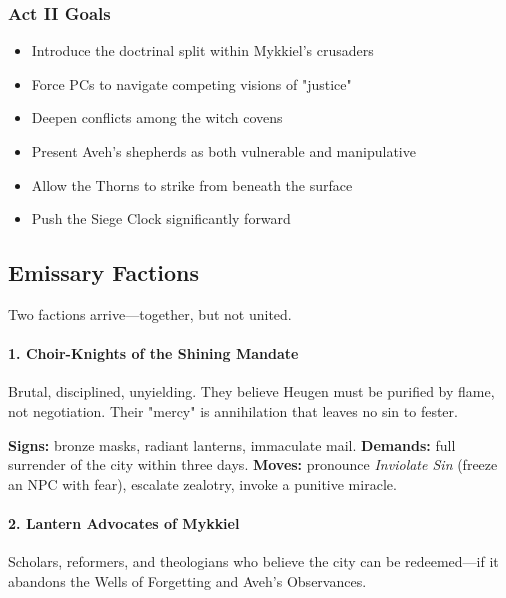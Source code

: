 \documentclass[11pt]{book}
\begin{document}
\subsubsection*{Act II Goals}
\begin{itemize}[leftmargin=*]
    \item Introduce the doctrinal split within Mykkiel's crusaders
    \item Force PCs to navigate competing visions of "justice"
    \item Deepen conflicts among the witch covens
    \item Present Aveh's shepherds as both vulnerable and manipulative
    \item Allow the Thorns to strike from beneath the surface
    \item Push the Siege Clock significantly forward
\end{itemize}

\subsection*{Emissary Factions}

Two factions arrive---together, but not united.

\paragraph{1. Choir-Knights of the Shining Mandate}
Brutal, disciplined, unyielding.  
They believe Heugen must be purified by flame, not negotiation.  
Their "mercy" is annihilation that leaves no sin to fester.

\textbf{Signs:} bronze masks, radiant lanterns, immaculate mail.  
\textbf{Demands:} full surrender of the city within three days.  
\textbf{Moves:} pronounce \emph{Inviolate Sin} (freeze an NPC with fear),  
escalate zealotry, invoke a punitive miracle.

\paragraph{2. Lantern Advocates of Mykkiel}
Scholars, reformers, and theologians who believe the city can be
redeemed---if it abandons the Wells of Forgetting and Aveh's Observances.
\end{document}
